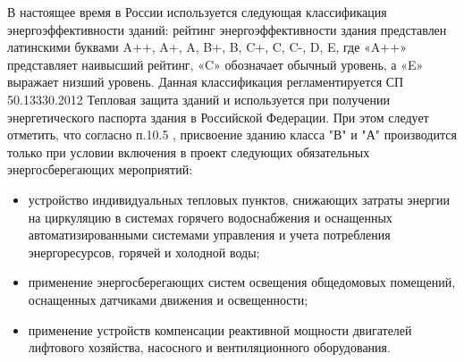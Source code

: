 

В настоящее время в России используется следующая классификация энергоэффективности зданий:
рейтинг энергоэффективности здания представлен латинскими буквами A++, A+, A, B+, B, C+, C, C-, D, E, где «A++» представляет наивысший рейтинг,
«C» обозначает обычный уровень, а «E» выражает низший уровень.  Данная классификация регламентируется СП 50.13330.2012 Тепловая защита зданий \cite{law_RU_Rules_Code_ThermalPerformance}
и используется при получении энергетического паспорта здания в Российской Федерации. При этом следует отметить, что  согласно п.10.5 \cite{law_RU_Rules_Code_ThermalPerformance},
присвоение зданию класса "В" и "А" производится только при условии включения в проект следующих обязательных энергосберегающих мероприятий:
\begin{itemize}
    \item устройство индивидуальных тепловых пунктов, снижающих затраты энергии на циркуляцию в системах горячего водоснабжения и оснащенных автоматизированными системами управления и учета потребления энергоресурсов, горячей и холодной воды;
    \item применение энергосберегающих систем освещения общедомовых помещений, оснащенных датчиками движения и освещенности;
    \item применение устройств компенсации реактивной мощности двигателей лифтового хозяйства, насосного и вентиляционного оборудования.
\end{itemize}

